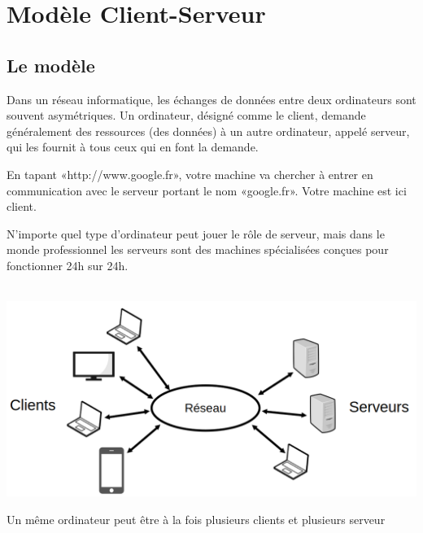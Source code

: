
\section{Modèle Client-Serveur}

\subsection{Le modèle}

\begin{definition}
	Dans un réseau informatique, les échanges de données entre deux ordinateurs sont souvent asymétriques. Un ordinateur, désigné comme le client, demande généralement des ressources (des données) à un autre ordinateur, appelé serveur, qui les fournit à tous ceux qui en font la demande.
\end{definition}

\begin{example}
	En tapant «http://www.google.fr», votre machine va chercher à entrer en communication avec le serveur portant le nom «google.fr». Votre machine est ici client.
\end{example}

\begin{rem}
	N'importe quel type d'ordinateur peut jouer le rôle de serveur, mais dans le monde professionnel les serveurs sont des machines spécialisées conçues pour fonctionner 24h sur 24h.
\end{rem}

\begin{personalise}[Schéma] \\
	\label{25-modele}
	\includegraphics[width=0.7\linewidth]{lecon/25-client-serveur/modele.png}
\end{personalise}

\begin{rem}
	Un même ordinateur peut être à la fois plusieurs clients et plusieurs serveur 
\end{rem}

